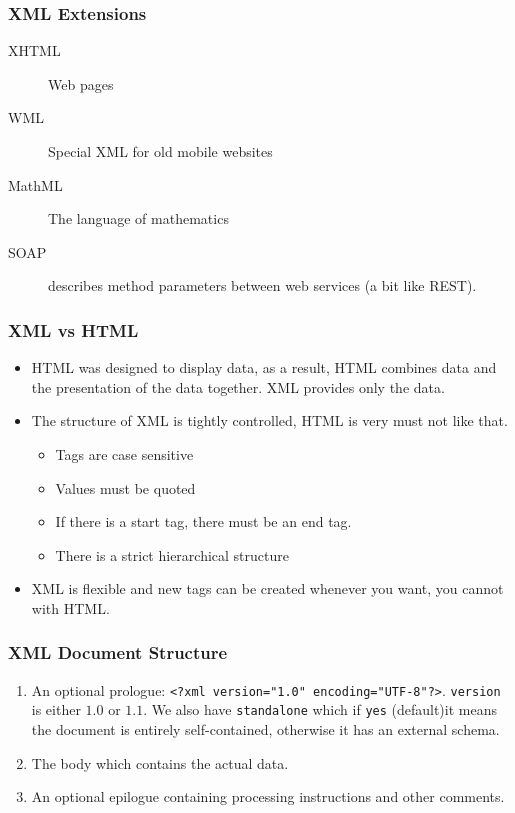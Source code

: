 \subsubsection{XML Extensions}\label{ssub:xml_extensions}

\begin{description}
	\item[XHTML] Web pages
	\item[WML] Special XML for old mobile websites
	\item[MathML] The language of mathematics
	\item[SOAP] describes method parameters between web services (a bit like REST).
\end{description}

\subsubsection{XML vs HTML}\label{ssub:xml_vs_html}

\begin{itemize}
	\item HTML was designed to display data, as a result, HTML combines data and the presentation of the data together. XML provides only the data.
	\item The structure of XML is tightly controlled, HTML is very must not like that.
	      \begin{itemize}
		      \item Tags are case sensitive
		      \item Values must be quoted
		      \item If there is a start tag, there must be an end tag.
		      \item There is a strict hierarchical structure
	      \end{itemize}
	\item XML is flexible and new tags can be created whenever you want, you cannot with HTML.
\end{itemize}

\subsubsection{XML Document Structure}\label{ssub:xml_document_structure}

\begin{enumerate}
	\item An optional prologue: \texttt{<?xml version="1.0" encoding="UTF-8"?>}.
	      \texttt{version} is either \(1.0\) or \(1.1\).
	      We also have \texttt{standalone} which if \texttt{yes} (default)it means the document is entirely self-contained, otherwise it has an external schema.
	\item The body which contains the actual data.
	\item An optional epilogue containing processing instructions and other comments.
\end{enumerate}

